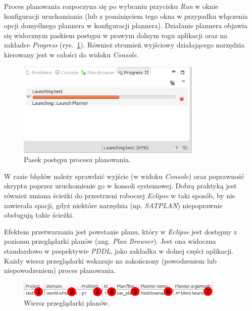 Proces planowania rozpoczyna się po wybraniu przycisku \textit{Run} w oknie konfiguracji uruchamiania (lub z pominięciem tego okna w przypadku włączenia opcji domyślnego plannera w konfiguracji plannera). Działanie plannera objawia się widocznym paskiem postępu w prawym dolnym rogu aplikacji oraz na zakładce \textit{Progress} (rys.~\ref{fig:run_progress}). Również strumień wyjściowy działającego narzędzia kierowany jest w całości do widoku \textit{Console}.

\newpage
\begin{figure}[h!]
    \centering
    \includegraphics[width=0.8\textwidth]{img/run_progress}
    \caption{Pasek postępu procesu planowania.}
    \label{fig:run_progress}
\end{figure}

W razie błędów należy sprawdzić wyjście (w widoku \textit{Console}) oraz poprawność skryptu poprzez uruchomienie go w konsoli systemowej. Dobrą praktyką jest również zmiana ścieżki do przestrzeni roboczej \textit{Eclipse} w taki sposób, by nie zawierała spacji, gdyż niektóre narzędzia (np. \textit{SATPLAN}) niepoprawnie obsługują takie ścieżki.

Efektem przetwarzania jest powstanie planu, który w \textit{Eclipse} jest dostępny z poziomu przeglądarki planów (ang. \textit{Plan Browser}). Jest ona widoczna standardowo w pespektywie \textit{PDDL}, jako zakładka w dolnej części aplikacji. Każdy wiersz przeglądarki wskazuje na zakończony (powodzeniem lub niepowodzeniem) proces planowania. 

\begin{figure}[h!]
    \centering
    \includegraphics[width=0.9\textwidth]{img/plan_browser_row}
    \caption{Wiersz przeglądarki planów.}
    \label{fig:plan_browser_row}
\end{figure}


